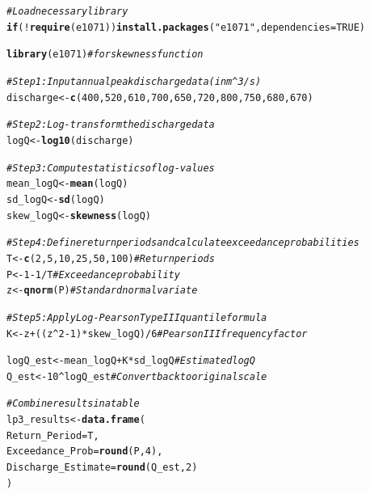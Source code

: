 \documentclass{tufte-handout}\usepackage[]{graphicx}\usepackage[]{xcolor}
\makeatletter
\newcommand{\hlnum}[1]{\textcolor[rgb]{0.686,0.059,0.569}{#1}}%
\newcommand{\hlstr}[1]{\textcolor[rgb]{0.192,0.494,0.8}{#1}}%
\newcommand{\hlcom}[1]{\textcolor[rgb]{0.678,0.584,0.686}{\textit{#1}}}%
\newcommand{\hlopt}[1]{\textcolor[rgb]{0,0,0}{#1}}%
\newcommand{\hlstd}[1]{\textcolor[rgb]{0.345,0.345,0.345}{#1}}%
\newcommand{\hlkwa}[1]{\textcolor[rgb]{0.161,0.373,0.58}{\textbf{#1}}}%
\newcommand{\hlkwb}[1]{\textcolor[rgb]{0.69,0.353,0.396}{#1}}%
\newcommand{\hlkwc}[1]{\textcolor[rgb]{0.333,0.667,0.333}{#1}}%
\newcommand{\hlkwd}[1]{\textcolor[rgb]{0.737,0.353,0.396}{\textbf{#1}}}%
\newenvironment{kframe}{%
 \def\at@end@of@kframe{}%
 \ifinner\ifhmode%
  \def\at@end@of@kframe{\end{minipage}}%
  \begin{minipage}{\columnwidth}%
 \fi\fi%
 \def\FrameCommand##1{\hskip\@totalleftmargin \hskip-\fboxsep
 \colorbox{shadecolor}{##1}\hskip-\fboxsep
     \hskip-\linewidth \hskip-\@totalleftmargin \hskip\columnwidth}%
 \MakeFramed {\advance\hsize-\width
   \@totalleftmargin\z@ \linewidth\hsize
   \@setminipage}}%
 {\par\unskip\endMakeFramed%
 \at@end@of@kframe}
\newenvironment{knitrout}{}{} %
\makeatother
\begin{document}
\begin{knitrout}
\color{fgcolor}\begin{kframe}
\begin{alltt}
\hlcom{# Load necessary library}
\hlkwa{if} \hlstd{(}\hlopt{!}\hlkwd{require}\hlstd{(e1071))} \hlkwd{install.packages}\hlstd{(}\hlstr{"e1071"}\hlstd{,} \hlkwc{dependencies} \hlstd{=} \hlnum{TRUE}\hlstd{)}
\end{alltt}


{\ttfamily\noindent\itshape\color{messagecolor}{\#\# Loading required package: e1071}}\begin{alltt}
\hlkwd{library}\hlstd{(e1071)}  \hlcom{# for skewness function}

\hlcom{# Step 1: Input annual peak discharge data (in m^3/s)}
\hlstd{discharge} \hlkwb{<-} \hlkwd{c}\hlstd{(}\hlnum{400}\hlstd{,} \hlnum{520}\hlstd{,} \hlnum{610}\hlstd{,} \hlnum{700}\hlstd{,} \hlnum{650}\hlstd{,} \hlnum{720}\hlstd{,} \hlnum{800}\hlstd{,} \hlnum{750}\hlstd{,} \hlnum{680}\hlstd{,} \hlnum{670}\hlstd{)}

\hlcom{# Step 2: Log-transform the discharge data}
\hlstd{logQ} \hlkwb{<-} \hlkwd{log10}\hlstd{(discharge)}

\hlcom{# Step 3: Compute statistics of log-values}
\hlstd{mean_logQ} \hlkwb{<-} \hlkwd{mean}\hlstd{(logQ)}
\hlstd{sd_logQ}   \hlkwb{<-} \hlkwd{sd}\hlstd{(logQ)}
\hlstd{skew_logQ} \hlkwb{<-} \hlkwd{skewness}\hlstd{(logQ)}

\hlcom{# Step 4: Define return periods and calculate exceedance probabilities}
\hlstd{T} \hlkwb{<-} \hlkwd{c}\hlstd{(}\hlnum{2}\hlstd{,} \hlnum{5}\hlstd{,} \hlnum{10}\hlstd{,} \hlnum{25}\hlstd{,} \hlnum{50}\hlstd{,} \hlnum{100}\hlstd{)}              \hlcom{# Return periods}
\hlstd{P} \hlkwb{<-} \hlnum{1} \hlopt{-} \hlnum{1} \hlopt{/} \hlstd{T}                             \hlcom{# Exceedance probability}
\hlstd{z} \hlkwb{<-} \hlkwd{qnorm}\hlstd{(P)}                              \hlcom{# Standard normal variate}

\hlcom{# Step 5: Apply Log-Pearson Type III quantile formula}
\hlstd{K} \hlkwb{<-} \hlstd{z} \hlopt{+} \hlstd{( (z}\hlopt{^}\hlnum{2} \hlopt{-} \hlnum{1}\hlstd{)} \hlopt{*} \hlstd{skew_logQ )} \hlopt{/} \hlnum{6}    \hlcom{# Pearson III frequency factor}

\hlstd{logQ_est} \hlkwb{<-} \hlstd{mean_logQ} \hlopt{+} \hlstd{K} \hlopt{*} \hlstd{sd_logQ}       \hlcom{# Estimated logQ}
\hlstd{Q_est} \hlkwb{<-} \hlnum{10}\hlopt{^}\hlstd{logQ_est}                      \hlcom{# Convert back to original scale}

\hlcom{# Combine results in a table}
\hlstd{lp3_results} \hlkwb{<-} \hlkwd{data.frame}\hlstd{(}
  \hlkwc{Return_Period} \hlstd{= T,}
  \hlkwc{Exceedance_Prob} \hlstd{=} \hlkwd{round}\hlstd{(P,} \hlnum{4}\hlstd{),}
  \hlkwc{Discharge_Estimate} \hlstd{=} \hlkwd{round}\hlstd{(Q_est,} \hlnum{2}\hlstd{)}
\hlstd{)}
\end{alltt}
\end{kframe}
\end{knitrout}
\end{document}
